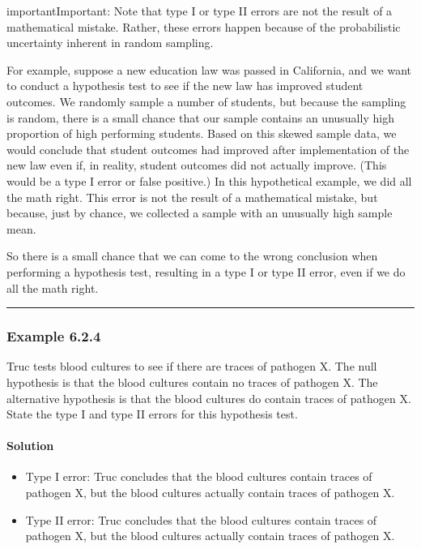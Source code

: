 \documentclass[letterpaper,10pt,english]{jupyterBook}
\begin{document}
\begin{sphinxadmonition}{important}{Important:}
\sphinxAtStartPar
Note that type I or type II errors are not the result of a mathematical mistake. Rather, these errors happen because of the probabilistic uncertainty inherent  in random sampling.

\sphinxAtStartPar
For example, suppose a new education law was passed in California, and we want to conduct a hypothesis test to see if the new law has improved student outcomes. We randomly sample a number of students, but because the sampling is random, there is a small chance that our sample contains an unusually high proportion of high performing students. Based on this skewed sample data, we would conclude that student outcomes had improved after implementation of the new law even if, in reality, student outcomes did not actually improve. (This would be a type I error or false positive.) In this hypothetical example, we did all the math right. This error is not the result of a mathematical mistake, but because, just by chance, we collected a sample with an unusually high sample mean.

\sphinxAtStartPar
So there is a small chance that we can come to the wrong conclusion when performing a hypothesis test, resulting in a type I or type II error, even if we do all the math right.
\end{sphinxadmonition}


\bigskip\hrule\bigskip



\subsubsection{Example 6.2.4}
\label{\detokenize{Ch6 An Introduction to Hypothesis Testing/6.2 Hypotheses and Errors:example-6-2-4}}
\sphinxAtStartPar
Truc tests blood cultures to see if there are traces of pathogen X. The null hypothesis is that the blood cultures contain no traces of pathogen X. The alternative hypothesis is that the blood cultures do contain traces of pathogen X. State the type I and type II errors for this hypothesis test.


\paragraph{Solution}
\label{\detokenize{Ch6 An Introduction to Hypothesis Testing/6.2 Hypotheses and Errors:id3}}\begin{itemize}
\item {} 
\sphinxAtStartPar
Type I error: Truc concludes that the blood cultures  contain traces of pathogen X, but the blood cultures actually  contain traces of pathogen X.

\item {} 
\sphinxAtStartPar
Type II error: Truc concludes that the blood cultures  contain traces of pathogen X, but the blood cultures actually  contain traces of pathogen X.

\end{itemize}
\end{document}
